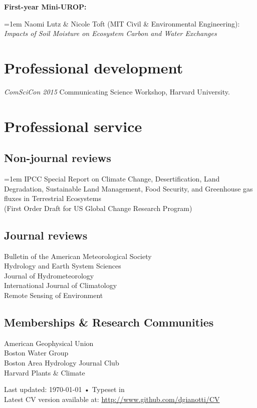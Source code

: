 \documentclass[10pt, a4paper]{article}
\renewcommand{\emph}[1]{\textit{#1}}
\newcommand{\lbr}{\vspace*{12pt}}
\newcommand{\years}[1]{\mbox{}\marginnote{\scriptsize #1}} %
\begin{document}
\textbf{First-year Mini-UROP:}
\par \years{2019} \hangindent=1em Naomi Lutz \& Nicole Toft (MIT Civil \& Environmental Engineering): \emph{Impacts of Soil Moisture on Ecosystem Carbon and Water Exchanges} \lbr

\section*{Professional development}
\years{2015}\emph{ComSciCon 2015} Communicating Science Workshop, Harvard University.\\

\section*{Professional service}

\subsection*{Non-journal reviews}
\years{2018} \hangindent=1em IPCC Special Report on Climate Change, Desertification, Land Degradation, Sustainable Land Management, Food Security, and Greenhouse gas fluxes in Terrestrial Ecosystems \\
(First Order Draft for US Global Change Research Program)

\subsection*{Journal reviews}
Bulletin of the American Meteorological Society\\
Hydrology and Earth System Sciences\\
Journal of Hydrometeorology\\
International Journal of Climatology\\
Remote Sensing of Environment

\subsection*{Memberships \& Research Communities}
American Geophysical Union\\ %
Boston Water Group\\ %
Boston Area Hydrology Journal Club\\ %
Harvard Plants \& Climate


\vfill{}

\begin{center}
{\scriptsize  Last updated: \today\- •\- 
Typeset in \href{http://nitens.org/taraborelli/cvtex}{
\XeTeX }\\
Latest CV version available at: \href{http://www.github.com/dgianotti/CV}{http://www.github.com/dgianotti/CV}}
\end{center}
\end{document}
